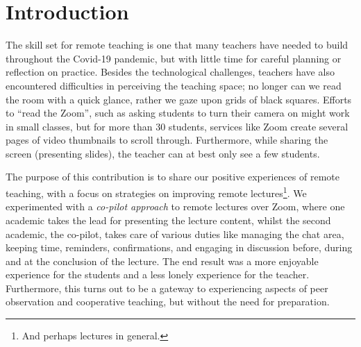 \documentclass[sigconf,natbib=false]{acmart}
\begin{document}


\maketitle

\section{Introduction}

The skill set for remote teaching is one that many teachers have needed to  build throughout the Covid-19 pandemic, but with little time for careful planning or reflection on practice. Besides the technological challenges, teachers have also encountered difficulties in perceiving the teaching space; no longer can we read the room with a quick glance, rather we gaze upon grids of black squares. Efforts to \enquote{read the Zoom}, such as asking students to turn their camera on might work in small classes, but for more than 30 students, services like Zoom create several pages of video thumbnails to scroll through. Furthermore, while sharing the screen (\eg presenting slides), the teacher can at best only see a few students.

The purpose of this contribution is to share our positive experiences of remote teaching, with a focus on strategies on improving remote lectures\footnote{And perhaps lectures in general.}. We experimented with a \emph{co-pilot approach} to remote lectures over Zoom, where one academic takes the lead for presenting the lecture content, whilst the second academic, the co-pilot, takes care of various duties like managing the chat area, keeping time, reminders, confirmations, and engaging in discussion before, during and at the conclusion of the lecture. The end result was a more enjoyable experience for the students and a less lonely experience for the teacher. Furthermore, this turns out to be a gateway to experiencing aspects of peer observation and cooperative teaching, but without the need for preparation.
\end{document}
